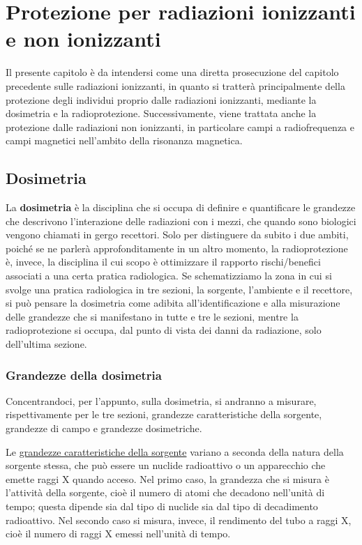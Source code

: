 \documentclass{report}
\numberwithin{equation}{section}
\numberwithin{figure}{section}
\begin{document}
\chapter{Protezione per radiazioni ionizzanti e non ionizzanti}

Il presente capitolo è da intendersi come una diretta prosecuzione del capitolo precedente sulle radiazioni ionizzanti, in quanto si tratterà principalmente della protezione degli individui proprio dalle radiazioni ionizzanti, mediante la dosimetria e la radioprotezione. Successivamente, viene trattata anche la protezione dalle radiazioni non ionizzanti, in particolare campi a radiofrequenza e campi magnetici nell'ambito della risonanza magnetica.

\section{Dosimetria}
La \textbf{dosimetria} è la disciplina che si occupa di definire e quantificare le grandezze che descrivono l’interazione delle radiazioni con i mezzi, che quando sono biologici vengono chiamati in gergo recettori. Solo per distinguere da subito i due ambiti, poiché se ne parlerà approfonditamente in un altro momento, la radioprotezione è, invece, la disciplina il cui scopo è ottimizzare il rapporto rischi/benefici associati a una certa pratica radiologica. Se schematizziamo la zona in cui si svolge una pratica radiologica in tre sezioni, la sorgente, l'ambiente e il recettore, si può pensare la dosimetria come adibita all'identificazione e alla misurazione delle grandezze che si manifestano in tutte e tre le sezioni, mentre la radioprotezione si occupa, dal punto di vista dei danni da radiazione, solo dell'ultima sezione.

\subsection{Grandezze della dosimetria}
Concentrandoci, per l'appunto, sulla dosimetria, si andranno a misurare, rispettivamente per le tre sezioni, grandezze caratteristiche della sorgente, grandezze di campo e grandezze dosimetriche.

Le \underline{grandezze caratteristiche della sorgente} variano a seconda della natura della sorgente stessa, che può essere un nuclide radioattivo o un apparecchio che emette raggi X quando acceso. Nel primo caso, la grandezza che si misura è l'attività della sorgente, cioè il numero di atomi che decadono nell'unità di tempo; questa dipende sia dal tipo di nuclide sia dal tipo di decadimento radioattivo. Nel secondo caso si misura, invece, il rendimento del tubo a raggi X, cioè il numero di raggi X emessi nell'unità di tempo.
\end{document}
